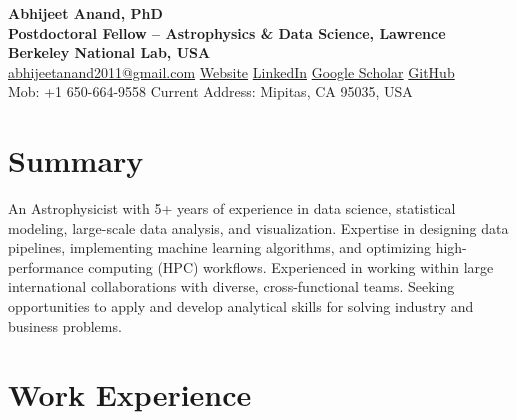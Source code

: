 \documentclass[a4paper,10pt]{article}
\begin{document}
\begin{center}
    {\huge \textbf{Abhijeet Anand, PhD}} \\
    {\normalsize \vspace{1.5mm}
    \textbf{Postdoctoral Fellow – Astrophysics \& Data Science, Lawrence Berkeley National Lab, USA}} \\
    \vspace{1.5mm}
\href{mailto:abhijeetanand2011@gmail.com}{abhijeetanand2011@gmail.com} \quad 
    \href{https://abhi0395.github.io}{Website} \quad
    \href{https://www.linkedin.com/in/abhijeet-anand-iisc}{LinkedIn} \quad
    \href{https://scholar.google.com/citations?hl=en&user=MfOuq1IAAAAJ}{Google Scholar} \quad
    \href{https://github.com/abhi0395}{GitHub}\\
    \vspace{1.5mm}
    Mob: +1 650-664-9558
     \quad 
    Current Address: Mipitas, CA 95035, USA \quad 
\end{center}
\vspace{-2mm}
\section*{Summary}
An Astrophysicist with 5+ years of experience in data science, statistical modeling, large-scale data analysis, and visualization. Expertise in designing data pipelines, implementing machine learning algorithms, and optimizing high-performance computing (HPC) workflows. Experienced in working within large international collaborations with diverse, cross-functional teams. Seeking opportunities to apply and develop analytical skills for solving industry and business problems.
\vspace*{-3mm}
\section*{Work Experience}
\end{document}
